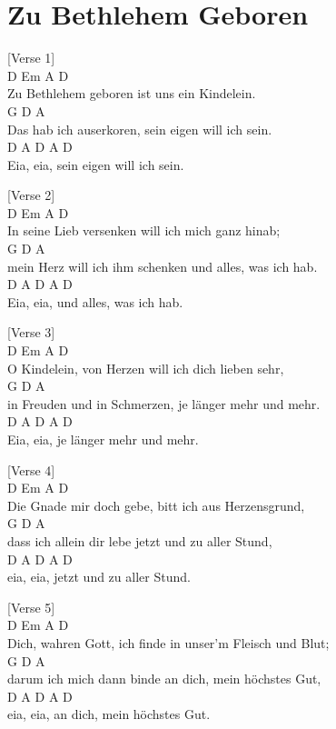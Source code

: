 \documentclass[
  letterpaper,
]{scrbook}
\begin{document}
\hypertarget{zu-bethlehem-geboren}{%
\chapter{Zu Bethlehem Geboren}\label{zu-bethlehem-geboren}}

{[}Verse 1{]}\\
D Em A D\\
Zu Bethlehem geboren ist uns ein Kindelein.\\
G D A\\
Das hab ich auserkoren, sein eigen will ich sein.\\
D A D A D\\
Eia, eia, sein eigen will ich sein.

{[}Verse 2{]}\\
D Em A D\\
In seine Lieb versenken will ich mich ganz hinab;\\
G D A\\
mein Herz will ich ihm schenken und alles, was ich hab.\\
D A D A D\\
Eia, eia, und alles, was ich hab.

{[}Verse 3{]}\\
D Em A D\\
O Kindelein, von Herzen will ich dich lieben sehr,\\
G D A\\
in Freuden und in Schmerzen, je länger mehr und mehr.\\
D A D A D\\
Eia, eia, je länger mehr und mehr.

{[}Verse 4{]}\\
D Em A D\\
Die Gnade mir doch gebe, bitt ich aus Herzensgrund,\\
G D A\\
dass ich allein dir lebe jetzt und zu aller Stund,\\
D A D A D\\
eia, eia, jetzt und zu aller Stund.

{[}Verse 5{]}\\
D Em A D\\
Dich, wahren Gott, ich finde in unser'm Fleisch und Blut;\\
G D A\\
darum ich mich dann binde an dich, mein höchstes Gut,\\
D A D A D\\
eia, eia, an dich, mein höchstes Gut.
\end{document}
